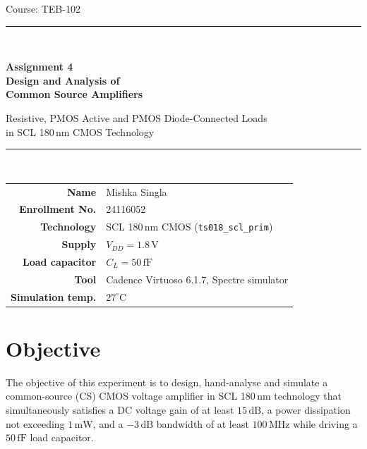 \documentclass[12pt,a4paper]{article}
\newcommand{\U}[1]{\,\mathrm{#1}}
\newcommand{\dg}{^{\circ}}
\begin{document}
\begin{titlepage}
\centering
\vspace*{1.2cm}
{\large Course: TEB-102\par}
\vspace{2.4cm}
\rule{\textwidth}{1.2pt}\\[0.5cm]
{\LARGE\bfseries Assignment 4\\[0.35cm]
Design and Analysis of\\[0.15cm]
Common Source Amplifiers\par}
\vspace{0.45cm}
{\large Resistive, PMOS Active and PMOS Diode-Connected Loads\\
in SCL 180\,nm CMOS Technology\par}
\vspace{0.4cm}
\rule{\textwidth}{1.2pt}\\[1.6cm]

\begin{tabular}{rl}
\textbf{Name}            & Mishka Singla \\
\textbf{Enrollment No.}  & 24116052 \\
\textbf{Technology}      & SCL 180\,nm CMOS (\texttt{ts018\_scl\_prim}) \\
\textbf{Supply}          & $V_{DD} = 1.8\U{V}$ \\
\textbf{Load capacitor}  & $C_L = 50\U{fF}$ \\
\textbf{Tool}            & Cadence Virtuoso 6.1.7, Spectre simulator \\
\textbf{Simulation temp.}& $27\dg$C \\
\end{tabular}

\vfill
\vspace{1.0cm}
\end{titlepage}

\tableofcontents
\clearpage
\listoffigures
\listoftables
\clearpage

\section{Objective}
The objective of this experiment is to design, hand-analyse and simulate a
common-source (CS) CMOS voltage amplifier in SCL 180\,nm technology that
simultaneously satisfies a DC voltage gain of at least $15\U{dB}$, a power
dissipation not exceeding $1\U{mW}$, and a $-3\U{dB}$ bandwidth of at least
$100\U{MHz}$ while driving a $50\U{fF}$ load capacitor.
\end{document}
